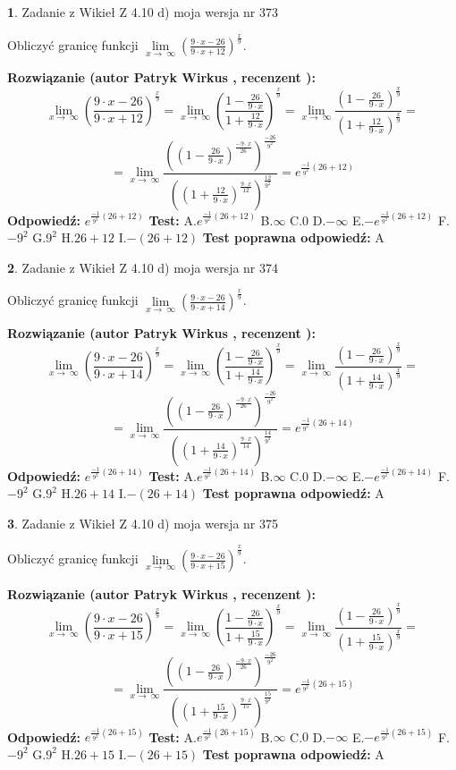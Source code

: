 \documentclass[12pt, a4paper]{article}
\theoremstyle{definition} %
\newtheorem{zad}{}
\newcommand{\zadStart}[1]{\begin{zad}#1\newline}
\newcommand{\zadStop}{\end{zad}}
\newcommand{\rozwStart}[2]{\noindent \textbf{Rozwiązanie (autor #1 , recenzent #2): }\newline}
\newcommand{\rozwStop}{\newline}
\newcommand{\odpStart}{\noindent \textbf{Odpowiedź:}\newline}
\newcommand{\odpStop}{\newline}
\newcommand{\testStart}{\noindent \textbf{Test:}\newline}
\newcommand{\testStop}{\newline}
\newcommand{\kluczStart}{\noindent \textbf{Test poprawna odpowiedź:}\newline}
\newcommand{\kluczStop}{\newline}
\begin{document}
\zadStart{Zadanie z Wikieł Z 4.10 d) moja wersja nr 373}


Obliczyć granicę funkcji  $\lim\limits_{x\to\ \infty}(\frac{9\cdot x-26}{9\cdot x+12})^{\frac{x}{9}}$.
\zadStop
\rozwStart{Patryk Wirkus}{}
$$\lim\limits_{x\to\ \infty}(\frac{9\cdot x-26}{9\cdot x+12})^{\frac{x}{9}} = \lim\limits_{x\to\ \infty}(\frac{1-\frac{26}{9\cdot x}}{1+\frac{12}{9\cdot x}})^{\frac{x}{9}}=\lim\limits_{x\to\ \infty}\frac{(1-\frac{26}{9\cdot x})^{\frac{x}{9}}}{(1+\frac{12}{9\cdot x})^{\frac{x}{9}}}=$$
$$=\lim\limits_{x\to\ \infty}\frac{((1-\frac{26}{9\cdot x})^{\frac{-9\cdot x}{26}})^{\frac{-26}{9^{2}}}}{((1+\frac{12}{9\cdot x})^{\frac{9\cdot x}{12}})^{\frac{12}{9^{2}}}}=e^{\frac{-1}{9^{2}}(26+12)}$$
\rozwStop
\odpStart
$e^{\frac{-1}{9^{2}}(26+12)}$
\odpStop
\testStart
A.$e^{\frac{-1}{9^{2}}(26+12)}$ B.$\infty$ C.$0$ D.$-\infty$ E.$-e^{\frac{-1}{9^{2}}(26+12)}$
F.$-9^{2}$ G.$9^{2}$
H.$26+12$
I.$-(26+12)$
\testStop
\kluczStart
A
\kluczStop



\zadStart{Zadanie z Wikieł Z 4.10 d) moja wersja nr 374}


Obliczyć granicę funkcji  $\lim\limits_{x\to\ \infty}(\frac{9\cdot x-26}{9\cdot x+14})^{\frac{x}{9}}$.
\zadStop
\rozwStart{Patryk Wirkus}{}
$$\lim\limits_{x\to\ \infty}(\frac{9\cdot x-26}{9\cdot x+14})^{\frac{x}{9}} = \lim\limits_{x\to\ \infty}(\frac{1-\frac{26}{9\cdot x}}{1+\frac{14}{9\cdot x}})^{\frac{x}{9}}=\lim\limits_{x\to\ \infty}\frac{(1-\frac{26}{9\cdot x})^{\frac{x}{9}}}{(1+\frac{14}{9\cdot x})^{\frac{x}{9}}}=$$
$$=\lim\limits_{x\to\ \infty}\frac{((1-\frac{26}{9\cdot x})^{\frac{-9\cdot x}{26}})^{\frac{-26}{9^{2}}}}{((1+\frac{14}{9\cdot x})^{\frac{9\cdot x}{14}})^{\frac{14}{9^{2}}}}=e^{\frac{-1}{9^{2}}(26+14)}$$
\rozwStop
\odpStart
$e^{\frac{-1}{9^{2}}(26+14)}$
\odpStop
\testStart
A.$e^{\frac{-1}{9^{2}}(26+14)}$ B.$\infty$ C.$0$ D.$-\infty$ E.$-e^{\frac{-1}{9^{2}}(26+14)}$
F.$-9^{2}$ G.$9^{2}$
H.$26+14$
I.$-(26+14)$
\testStop
\kluczStart
A
\kluczStop



\zadStart{Zadanie z Wikieł Z 4.10 d) moja wersja nr 375}


Obliczyć granicę funkcji  $\lim\limits_{x\to\ \infty}(\frac{9\cdot x-26}{9\cdot x+15})^{\frac{x}{9}}$.
\zadStop
\rozwStart{Patryk Wirkus}{}
$$\lim\limits_{x\to\ \infty}(\frac{9\cdot x-26}{9\cdot x+15})^{\frac{x}{9}} = \lim\limits_{x\to\ \infty}(\frac{1-\frac{26}{9\cdot x}}{1+\frac{15}{9\cdot x}})^{\frac{x}{9}}=\lim\limits_{x\to\ \infty}\frac{(1-\frac{26}{9\cdot x})^{\frac{x}{9}}}{(1+\frac{15}{9\cdot x})^{\frac{x}{9}}}=$$
$$=\lim\limits_{x\to\ \infty}\frac{((1-\frac{26}{9\cdot x})^{\frac{-9\cdot x}{26}})^{\frac{-26}{9^{2}}}}{((1+\frac{15}{9\cdot x})^{\frac{9\cdot x}{15}})^{\frac{15}{9^{2}}}}=e^{\frac{-1}{9^{2}}(26+15)}$$
\rozwStop
\odpStart
$e^{\frac{-1}{9^{2}}(26+15)}$
\odpStop
\testStart
A.$e^{\frac{-1}{9^{2}}(26+15)}$ B.$\infty$ C.$0$ D.$-\infty$ E.$-e^{\frac{-1}{9^{2}}(26+15)}$
F.$-9^{2}$ G.$9^{2}$
H.$26+15$
I.$-(26+15)$
\testStop
\kluczStart
A
\kluczStop
\end{document}
